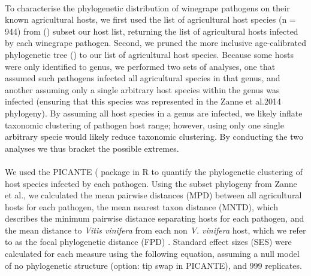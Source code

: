 \documentclass{article}
\begin{document}
\paragraph{}To characterise the phylogenetic distribution of winegrape pathogens on their known agricultural hosts, we first used the list of agricultural host species (n = 944) from (\citep{Milla2018}) subset our host list, returning the list of agricultural hosts infected by each winegrape pathogen. Second, we pruned the more inclusive age-calibrated phylogenetic tree (\citep{Zanne2014}) to our list of agricultural host species. Because some hosts were only identified to genus, we performed two sets of analyses, one that assumed such pathogens infected all agricultural species in that genus, and another assuming only a single arbitrary host species within the genus was infected (ensuring that this species was represented in the Zanne et al.2014 phylogeny\citep{Zanne2014}). By assuming all host species in a genus are infected, we likely inflate taxonomic clustering of pathogen host range;  however, using only one single arbitrary specie would likely reduce taxonomic clustering. By conducting the two analyses we thus bracket the possible extremes.

\paragraph{}We used the PICANTE (\citep{PICANTE} package in R to quantify the phylogenetic clustering of host species infected by each pathogen. Using the subset phylogeny from Zanne et al.\citep{Zanne2014}, we calculated the mean pairwise distances (MPD) between all agricultural hosts for each pathogen, the mean nearest taxon distance (MNTD), which describes the minimum pairwise distance separating hosts for each pathogen, and the mean distance to \textit{Vitis vinifera} from each non \textit{V. vinifera} host, which we refer to as the focal phylogenetic distance (FPD) . Standard effect sizes (SES) were calculated for each measure using the following equation, assuming a null model of no phylogenetic structure (option: tip swap in PICANTE), and 999 replicates.
\end{document}
